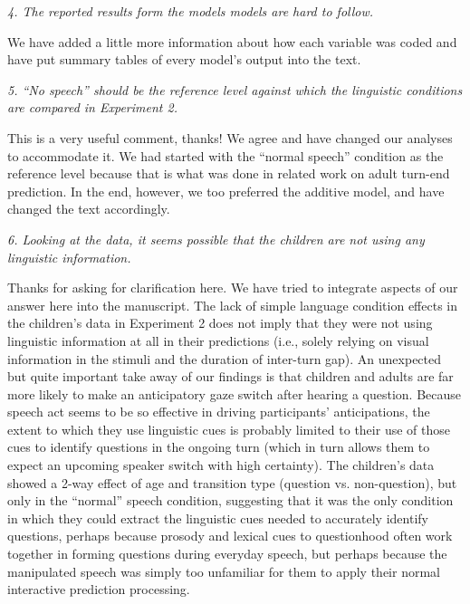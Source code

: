 \documentclass[11pt,a4paper]{letter} %
\begin{document}
\begin{letter}{}
\smallskip

\noindent \textit{4. The reported results form the models models are hard to follow.}

\noindent We have added a little more information about how each variable was coded and have put summary tables of every model's output into the text.

\smallskip

\noindent \textit{5. ``No speech'' should be the reference level against which the linguistic conditions are compared in Experiment 2.}

\noindent This is a very useful comment, thanks! We agree and have changed our analyses to accommodate it. We had started with the ``normal speech'' condition as the reference level because that is what was done in related work on adult turn-end prediction. In the end, however, we too preferred the additive model, and have changed the text accordingly.

\noindent \textit{6. Looking at the data, it seems possible that the children are not using any linguistic information.}

\noindent Thanks for asking for clarification here. We have tried to integrate aspects of our answer here into the manuscript. The lack of simple language condition effects in the children's data in Experiment 2 does not imply that they were not using linguistic information at all in their predictions (i.e., solely relying on visual information in the stimuli and the duration of inter-turn gap). An unexpected but quite important take away of our findings is that children and adults are far more likely to make an anticipatory gaze switch after hearing a question. Because speech act seems to be so effective in driving participants' anticipations, the extent to which they use linguistic cues is probably limited to their use of those cues to identify questions in the ongoing turn (which in turn allows them to expect an upcoming speaker switch with high certainty). The children's data showed a 2-way effect of age and transition type (question vs. non-question), but only in the ``normal'' speech condition, suggesting that it was the only condition in which they could extract the linguistic cues needed to accurately identify questions, perhaps because prosody and lexical cues to questionhood often work together in forming questions during everyday speech, but perhaps because the manipulated speech was simply too unfamiliar for them to apply their normal interactive prediction processing.


\end{letter}
\end{document}
